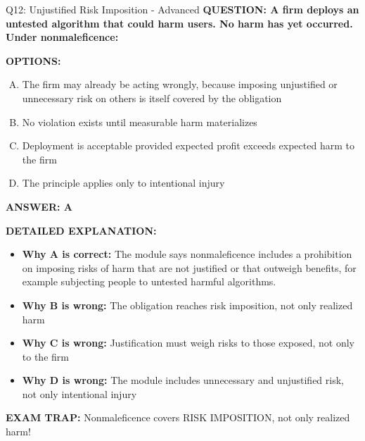 \documentclass[8pt]{beamer}
\begin{document}
\begin{frame}[shrink=6]{Q12: Unjustified Risk Imposition - Advanced}
\fontsize{6.5}{7.5}\selectfont
\textbf{QUESTION: A firm deploys an untested algorithm that could harm users. No harm has yet occurred. Under nonmaleficence:}

\vspace{0.1cm}
\textbf{OPTIONS:}
\begin{enumerate}[A.]
\item The firm may already be acting wrongly, because imposing unjustified or unnecessary risk on others is itself covered by the obligation
\item No violation exists until measurable harm materializes
\item Deployment is acceptable provided expected profit exceeds expected harm to the firm
\item The principle applies only to intentional injury
\end{enumerate}

\vspace{0.1cm}
\textcolor{myblue}{\textbf{ANSWER: A}}

\vspace{0.1cm}
\textbf{DETAILED EXPLANATION:}
\begin{itemize}
\item \textbf{Why A is correct:} The module says nonmaleficence includes a prohibition on imposing risks of harm that are not justified or that outweigh benefits, for example subjecting people to untested harmful algorithms.
\item \textbf{Why B is wrong:} The obligation reaches risk imposition, not only realized harm
\item \textbf{Why C is wrong:} Justification must weigh risks to those exposed, not only to the firm
\item \textbf{Why D is wrong:} The module includes unnecessary and unjustified risk, not only intentional injury
\end{itemize}

\textcolor{myred}{\textbf{EXAM TRAP:}} Nonmaleficence covers RISK IMPOSITION, not only realized harm!
\end{frame}
\end{document}
